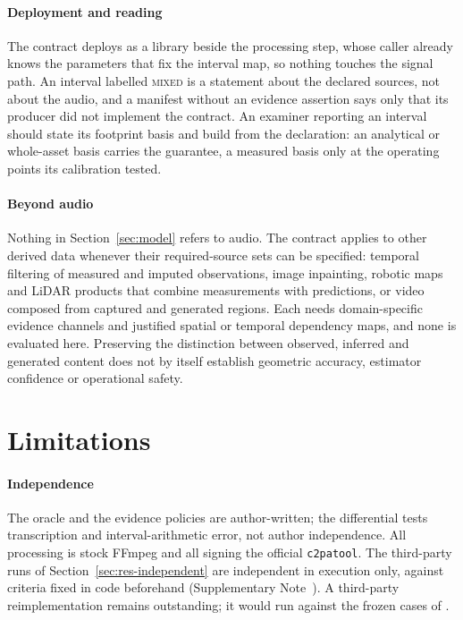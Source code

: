 \documentclass[preprint,3p,11pt,authoryear]{elsarticle}
\begin{document}
\paragraph{Deployment and reading} The contract deploys as
a library beside the processing step, whose caller already knows the parameters
that fix the interval map, so nothing touches the signal path. An interval
labelled \textsc{mixed} is a statement about the declared sources, not about the
audio, and a manifest without an evidence assertion says only that its producer
did not implement the contract. An examiner reporting an interval should state its
footprint basis and build from the declaration: an analytical or whole-asset
basis carries the guarantee, a measured basis only at the operating points its
calibration tested.

\paragraph{Beyond audio} Nothing in Section~\ref{sec:model} refers to audio. The
contract applies to other derived data whenever their required-source sets can be
specified: temporal filtering of measured and imputed observations, image
inpainting, robotic maps and LiDAR products that combine measurements with
predictions, or video composed from captured and generated regions. Each needs
domain-specific evidence channels and justified spatial or temporal dependency
maps, and none is evaluated here. Preserving the distinction between observed,
inferred and generated content does not by itself establish geometric accuracy,
estimator confidence or operational safety.

\section{Limitations}
\label{sec:limits}

\paragraph{Independence} The oracle and the evidence policies are
author-written; the differential tests transcription and interval-arithmetic
error, not author independence. All processing is stock FFmpeg and all signing
the official \texttt{c2patool}. The third-party runs of
Section~\ref{sec:res-independent} are independent in execution only, against
criteria fixed in code beforehand (Supplementary Note~\NoteRepro{}). A
third-party reimplementation remains outstanding; it would run against the
\Hcases{} frozen cases of .
\end{document}
